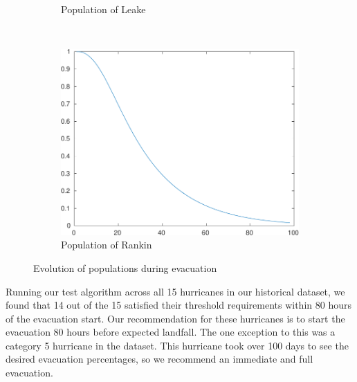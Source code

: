 \documentclass[titlepage]{article}
\begin{document}
\begin{figure}[H]
\begin{subfigure}[b]{0.3\textwidth}
        \caption{Population of Leake}
        \label{fig:pop_county39}
      \end{subfigure}~
      \begin{subfigure}[b]{0.3\textwidth}
        \center
        \includegraphics[width=\textwidth]{figures/pop_county_60-crop.pdf}
        \caption{Population of Rankin}
        \label{fig:pop_county60}
      \end{subfigure}
      \caption{Evolution of populations during evacuation}
      \label{fig:pop_deter}
    \end{figure}

    Running our test algorithm across all 15 hurricanes in our historical dataset, we found that 14 out of the 15 satisfied their threshold requirements within 80 hours of the evacuation start. Our recommendation for these hurricanes is to start the evacuation 80 hours before expected landfall. The one exception to this was a category 5 hurricane in the dataset. This hurricane took over 100 days to see the desired evacuation percentages, so we recommend an immediate and full evacuation.
\end{document}

